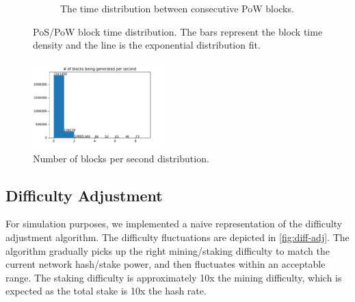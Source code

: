 \documentclass[a4paper]{article}
\begin{document}
\begin{figure}
\begin{subfigure}[b]{0.3\textwidth}
        \caption{The time distribution between consecutive PoW blocks.}
    \end{subfigure}
    \caption{PoS/PoW block time distribution. The bars represent the block time density and the line is the exponential distribution fit.}
    \label{fig:block-time}
\end{figure}

\begin{figure}[h]
    \centering
    \includegraphics[width=0.45\textwidth]{assets/forks.pdf}
    \caption{Number of blocks per second distribution.}
    \label{forks}
\end{figure}

\subsection{Difficulty Adjustment}

For simulation purposes, we implemented a naive representation of the difficulty adjustment algorithm. The difficulty fluctuations are depicted in \cref{fig:diff-adj}. The algorithm gradually picks up the right mining/staking difficulty to match the current network hash/stake power, and then fluctuates within an acceptable range. The staking difficulty is approximately 10x the mining difficulty, which is expected as the total stake is 10x the hash rate.
\end{document}
